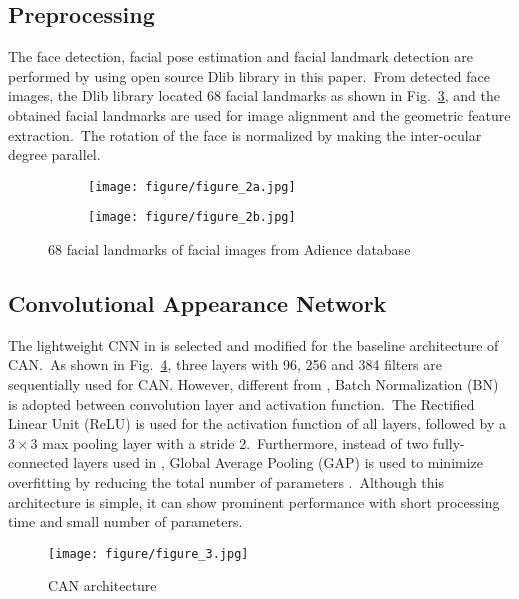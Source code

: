 \documentclass[10pt,twocolumn,letterpaper]{article}
\begin{document}
\subsection{Preprocessing}
The face detection, facial pose estimation and facial landmark detection are performed by using open source Dlib library \cite{dlib09} in this paper.~From detected face images, the Dlib library located 68 facial landmarks as shown in Fig.~\ref{fig:figure_2}, and the obtained facial landmarks are used for image alignment and the geometric feature extraction.~The rotation of the face is normalized by making the inter-ocular degree parallel.
\begin{figure}[!h]
\centering
\begin{subfigure}[t]{0.4\linewidth}
    \centering
    \texttt{[image: figure/figure\_2a.jpg]}
    \caption{}
    \label{fig:figure_2a}
\end{subfigure}
\quad
\begin{subfigure}[t]{0.4\linewidth}
    \centering
    \texttt{[image: figure/figure\_2b.jpg]}
    \caption{}
    \label{fig:figure_2b}
\end{subfigure}
\caption{68 facial landmarks of facial images from Adience database \cite{Eidinger2014}}
\label{fig:figure_2}
\end{figure}

\subsection{Convolutional Appearance Network}
The lightweight CNN in \cite{Xing2017} is selected and modified for the baseline architecture of CAN.~As shown in Fig.~\ref{fig:figure_3}, three layers with 96, 256 and 384 filters are sequentially used for CAN. However, different from \cite{Xing2017}, Batch Normalization (BN) \cite{Ioffe2015} is adopted between convolution layer and activation function.~The Rectified Linear Unit (ReLU) \cite{Nair2010} is used for the activation function of all layers, followed by a $3\times3$ max pooling layer with a stride 2.~Furthermore, instead of two fully-connected layers used in \cite{Xing2017}, Global Average Pooling (GAP) is used to minimize overfitting by reducing the total number of parameters \cite{DBLP:journals/corr/LinCY13}.~Although this architecture is simple, it can show prominent performance with short processing time and small number of parameters.

\label{CAN}
\begin{figure}[!h]
\begin{center}
    \texttt{[image: figure/figure\_3.jpg]}
\end{center}
\caption{CAN architecture}
\label{fig:figure_3}
\end{figure}
\end{document}
